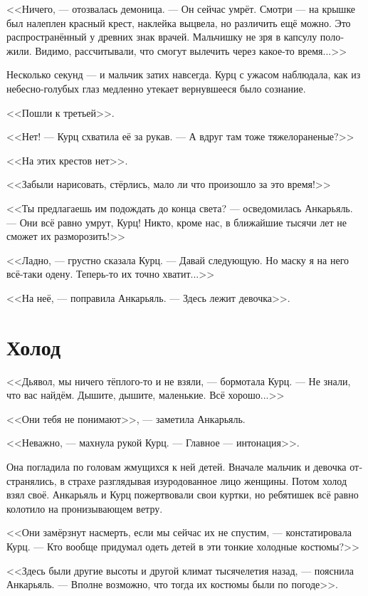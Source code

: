 \documentclass[a4paper,10pt,fleqn]{book}\usepackage{polyglossia}\setdefaultlanguage[babelshorthands=true]{russian}\setotherlanguage{english}\defaultfontfeatures{Ligatures=TeX,Mapping=tex-text}\usepackage{xcolor}\newcommand{\ml}[3]{#2}
\begin{document}
<<Ничего, --- отозвалась демоница.
--- Он сейчас умрёт.
Смотри --- на крышке был налеплен красный крест, наклейка выцвела, но различить ещё можно.
Это распространённый у древних знак врачей.
Мальчишку не зря в капсулу положили.
Видимо, рассчитывали, что смогут вылечить через какое-то время...>>

Несколько секунд --- и мальчик затих навсегда.
Курц с ужасом наблюдала, как из небесно-голубых глаз медленно утекает вернувшееся было сознание.

<<Пошли к третьей>>.

<<Нет! --- Курц схватила её за рукав.
--- А вдруг там тоже тяжелораненые?>>

<<На этих крестов нет>>.

<<Забыли нарисовать, стёрлись, мало ли что произошло за это время!>>

<<Ты предлагаешь им подождать до конца света? --- осведомилась Анкарьяль.
--- Они всё равно умрут, Курц!
Никто, кроме нас, в ближайшие тысячи лет не сможет их разморозить!>>

<<Ладно, --- грустно сказала Курц.
--- Давай следующую.
Но маску я на него всё-таки одену.
Теперь-то их точно хватит...>>

<<На неё, --- поправила Анкарьяль.
--- Здесь лежит девочка>>.

\section{Холод}

<<Дьявол, мы ничего тёплого-то и не взяли, --- бормотала Курц.
--- Не знали, что вас найдём.
Дышите, дышите, маленькие.
Всё хорошо...>>

<<Они тебя не понимают>>, --- заметила Анкарьяль.

<<Неважно, --- махнула рукой Курц.
--- Главное --- интонация>>.

Она погладила по головам жмущихся к ней детей.
Вначале мальчик и девочка отстранялись, в страхе разглядывая изуродованное лицо женщины.
Потом холод взял своё.
Анкарьяль и Курц пожертвовали свои куртки, но ребятишек всё равно колотило на пронизывающем ветру.

<<Они замёрзнут насмерть, если мы сейчас их не спустим, --- констатировала Курц.
--- Кто вообще придумал одеть детей в эти тонкие холодные костюмы?>>

<<Здесь были другие высоты и другой климат тысячелетия назад, --- пояснила Анкарьяль.
--- Вполне возможно, что тогда их костюмы были по погоде>>.
\end{document}
